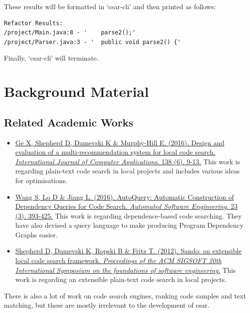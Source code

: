 \documentclass[12pt, letterpaper]{article}
\begin{document}
These results will be formatted in `csar-cli' and then printed as follows:
\begin{lstlisting}
Refactor Results:
/project/Main.java:8 - '    parse2();'
/project/Parser.java:3 - '  public void parse2() {'
\end{lstlisting}

Finally, `csar-cli' will terminate.

\section{Background Material}
\subsection{Related Academic Works}
\begin{itemize}
  \item \href{http://www.sciencedirect.com.ezproxy.library.qmul.ac.uk/science/article/pii/S1045926X16300970?_rdoc=1&_fmt=high&_origin=gateway&_docanchor=&md5=b8429449ccfc9c30159a5f9aeaa92ffb&ccp=y}{Ge X, Shepherd D, Damevski K \& Murphy-Hill E. (2016). Design and evaluation of a multi-recommendation system for local code search. \textit{International Journal of Computer Applications}. 138 (6). 9-13.}\newline
  This work is regarding plain-text code search in local projects and includes various ideas for optimisations.
  \item \href{https://link-springer-com.ezproxy.library.qmul.ac.uk/article/10.1007%2Fs10515-014-0170-2}{Wang S, Lo D \& Jiang L. (2016). AutoQuery: Automatic Construction of Dependency Queries for Code Search. \textit{Automated Software Engineering}. 23 (3). 393-425.}\newline
  This work is regarding dependence-based code searching.
  They have also devised a query language to make producing Program Dependency Graphs easier.
  \item \href{http://dl.acm.org.ezproxy.library.qmul.ac.uk/citation.cfm?id=2393612}{Shepherd D, Damevski K, Ropski B \& Fritz T. (2012). Sando: an extensible local code search framework. \textit{Proceedings of the ACM SIGSOFT 20th International Symposium on the foundations of software engineering}.}\newline
  This work is regarding an extensible plain-text code search in local projects.
\end{itemize}

There is also a lot of work on code search engines, ranking code samples and text matching, but these are mostly irrelevant to the development of csar.
\end{document}
